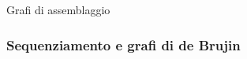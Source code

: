 \begin{frame}
      \titlepage

        \centering
          Grafi di assemblaggio
\end{frame}


\begin{frame}[fragile]
\frametitle{Sequenziamento e grafi di de Brujin}
\end{frame}

